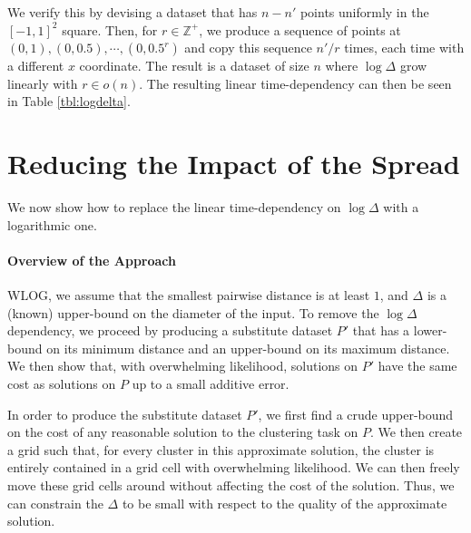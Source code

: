 We verify this by devising a dataset that has $n - n'$ points uniformly in the $[-1, 1]^2$ square. Then, for $r \in \mathbb{Z}^+$, we produce a sequence of
points at $(0, 1), (0, 0.5), \cdots, (0, 0.5^r)$ and copy this sequence $n' / r$ times, each time with a different $x$ coordinate. The result is a dataset of
size $n$ where $\log \Delta$ grow linearly with $r \in o(n)$. The resulting linear time-dependency can then be seen in Table \ref{tbl:logdelta}.



\section{Reducing the Impact of the Spread}
\label{sec:theory} %
\newcommand{\boxsize}{\textsc{MaxDist}}
We now show how to replace the linear time-dependency on $\log \Delta$ with a logarithmic one.

\paragraph*{Overview of the Approach}

WLOG, we assume that the smallest pairwise distance is at least $1$, and $\Delta$ is a (known) upper-bound on the diameter of the input. To remove
the $\log\Delta$ dependency, we proceed by producing a substitute dataset $P'$ that has a lower-bound on its minimum distance and an upper-bound on its maximum
distance. We then show that, with overwhelming likelihood, solutions on $P'$ have the same cost as solutions on $P$ up to a small additive error.

In order to produce the substitute dataset $P'$, we first find a crude upper-bound on the cost of any reasonable solution to the clustering task on $P$. We
then create a grid such that, for every cluster in this approximate solution, the cluster is entirely contained in a grid cell with overwhelming likelihood. We can then freely move these
grid cells around without affecting the cost of the solution. Thus, we can constrain the $\Delta$ to be small with respect to the quality of the approximate solution.


